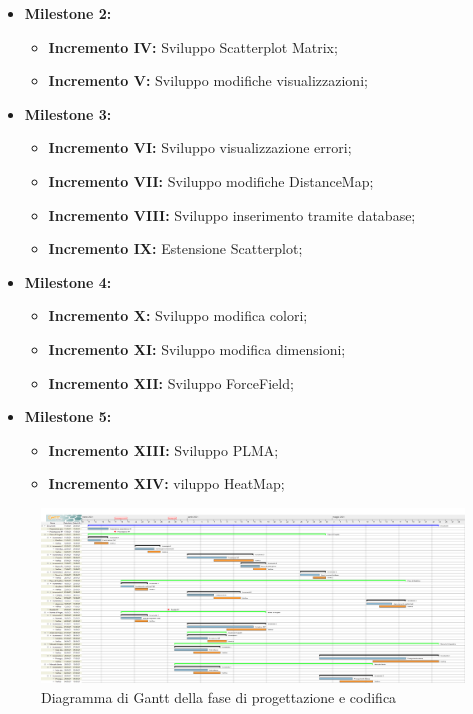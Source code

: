 \documentclass[../piano_di_progetto.tex]{subfiles}
\begin{document}
\begin{itemize}
\begin{itemize}
    \item \textbf{Milestone 2:}
        \begin{itemize}
            \item \textbf{Incremento IV:} Sviluppo Scatterplot Matrix;
            \item \textbf{Incremento V:} Sviluppo modifiche visualizzazioni;
	\end{itemize}
    \item \textbf{Milestone 3:}
        \begin{itemize}
            \item \textbf{Incremento VI:} Sviluppo visualizzazione errori;
            \item \textbf{Incremento VII:} Sviluppo modifiche DistanceMap;
            \item \textbf{Incremento VIII:} Sviluppo inserimento tramite database;
            \item \textbf{Incremento IX:} Estensione Scatterplot;
    \end{itemize}
    \item \textbf{Milestone 4:}
        \begin{itemize}
            \item \textbf{Incremento X:} Sviluppo modifica colori;
            \item \textbf{Incremento XI:} Sviluppo modifica dimensioni;
            \item \textbf{Incremento XII:} Sviluppo ForceField;
    \end{itemize}
    \item \textbf{Milestone 5:}
        \begin{itemize}
            \item \textbf{Incremento XIII:} Sviluppo PLMA;
            \item \textbf{Incremento XIV:} viluppo HeatMap;
    \end{itemize}
\end{itemize}
\end{itemize}


\begin{figure}[H]
    \centering
    \includegraphics[width=18cm]{src/img/gantt/documenti_riveduti_RQ.png}
    \caption{Diagramma di Gantt della fase di progettazione e codifica}

\end{figure}
\end{document}

